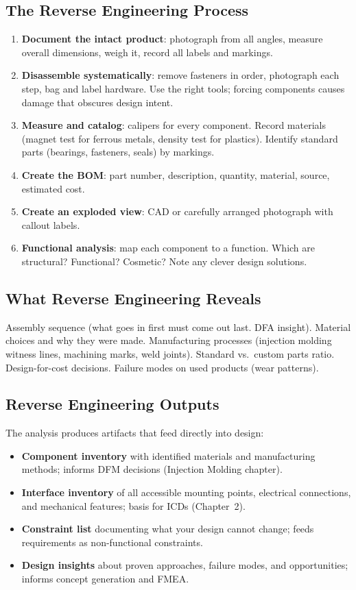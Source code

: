\documentclass[11pt,letterpaper,twoside,openany]{book}
\begin{document}
\subsection{The Reverse Engineering Process}
\begin{enumerate}[leftmargin=1.5em]
\item \textbf{Document the intact product}: photograph from all angles, measure overall dimensions, weigh it, record all labels and markings.
\item \textbf{Disassemble systematically}: remove fasteners in order, photograph each step, bag and label hardware. Use the right tools; forcing components causes damage that obscures design intent.
\item \textbf{Measure and catalog}: calipers for every component. Record materials (magnet test for ferrous metals, density test for plastics). Identify standard parts (bearings, fasteners, seals) by markings.
\item \textbf{Create the BOM}: part number, description, quantity, material, source, estimated cost.
\item \textbf{Create an exploded view}: CAD or carefully arranged photograph with callout labels.
\item \textbf{Functional analysis}: map each component to a function. Which are structural? Functional? Cosmetic? Note any clever design solutions.
\end{enumerate}

\subsection{What Reverse Engineering Reveals}
Assembly sequence (what goes in first must come out last. DFA insight). Material choices and why they were made. Manufacturing processes (injection molding witness lines, machining marks, weld joints). Standard vs.\ custom parts ratio. Design-for-cost decisions. Failure modes on used products (wear patterns).


\subsection{Reverse Engineering Outputs}
The analysis produces artifacts that feed directly into design:
\begin{itemize}[leftmargin=1.5em]
\item \textbf{Component inventory} with identified materials and manufacturing methods; informs DFM decisions (Injection Molding chapter).
\item \textbf{Interface inventory} of all accessible mounting points, electrical connections, and mechanical features; basis for ICDs (Chapter~2).
\item \textbf{Constraint list} documenting what your design cannot change; feeds requirements as non-functional constraints.
\item \textbf{Design insights} about proven approaches, failure modes, and opportunities; informs concept generation and FMEA.
\end{itemize}
\end{document}
